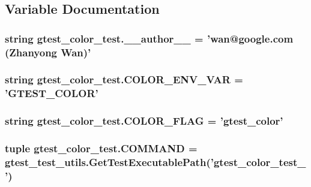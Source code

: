 \subsection{Variable Documentation}
\hypertarget{namespacegtest__color__test_aed3212d01eb48ec3b2ce43de461f9e84}{
\subsubsection[{\-\_\-\-\_\-author\-\_\-\-\_\-}]{\setlength{\rightskip}{0pt plus 5cm}string gtest\-\_\-color\-\_\-test.\-\_\-\-\_\-author\-\_\-\-\_\- = 'wan@google.\-com (Zhanyong Wan)'}}\label{namespacegtest__color__test_aed3212d01eb48ec3b2ce43de461f9e84}
\hypertarget{namespacegtest__color__test_aa6deaa7da27bcc115fe666abad13419c}{
\subsubsection[{C\-O\-L\-O\-R\-\_\-\-E\-N\-V\-\_\-\-V\-A\-R}]{\setlength{\rightskip}{0pt plus 5cm}string gtest\-\_\-color\-\_\-test.\-C\-O\-L\-O\-R\-\_\-\-E\-N\-V\-\_\-\-V\-A\-R = 'G\-T\-E\-S\-T\-\_\-\-C\-O\-L\-O\-R'}}\label{namespacegtest__color__test_aa6deaa7da27bcc115fe666abad13419c}
\hypertarget{namespacegtest__color__test_af5818cea608c0551909fefbeaf0edf20}{
\subsubsection[{C\-O\-L\-O\-R\-\_\-\-F\-L\-A\-G}]{\setlength{\rightskip}{0pt plus 5cm}string gtest\-\_\-color\-\_\-test.\-C\-O\-L\-O\-R\-\_\-\-F\-L\-A\-G = 'gtest\-\_\-color'}}\label{namespacegtest__color__test_af5818cea608c0551909fefbeaf0edf20}
\hypertarget{namespacegtest__color__test_aeea73d02198b607c38e9dccb97235322}{
\subsubsection[{C\-O\-M\-M\-A\-N\-D}]{\setlength{\rightskip}{0pt plus 5cm}tuple gtest\-\_\-color\-\_\-test.\-C\-O\-M\-M\-A\-N\-D = {\bf gtest\-\_\-test\-\_\-utils.\-Get\-Test\-Executable\-Path}('gtest\-\_\-color\-\_\-test\-\_\-')}}\label{namespacegtest__color__test_aeea73d02198b607c38e9dccb97235322}
